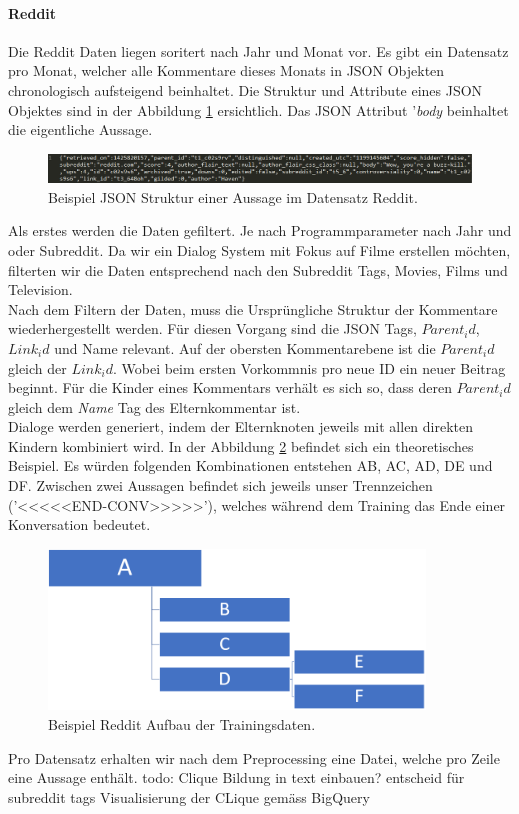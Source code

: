 \paragraph{Reddit} Die Reddit Daten liegen soritert nach Jahr und Monat vor. Es gibt ein Datensatz pro Monat, welcher alle Kommentare dieses Monats in JSON Objekten chronologisch aufsteigend beinhaltet. Die Struktur und Attribute eines JSON Objektes sind in der Abbildung \ref{fig:data:reddit:examp:json} ersichtlich. Das JSON Attribut '\emph{body} beinhaltet die eigentliche Aussage.
\begin{figure}[h]
	\centering
	\includegraphics[width=16cm]{img/Reddit_example_json.PNG}
	\caption{Beispiel JSON Struktur einer Aussage im Datensatz Reddit.}
	\label{fig:data:reddit:examp:json}
\end{figure}
Als erstes werden die Daten gefiltert. Je nach Programmparameter nach Jahr und oder Subreddit. Da wir ein Dialog System mit Fokus auf Filme erstellen möchten, filterten wir die Daten entsprechend nach den Subreddit Tags, Movies, Films und Television.\\
Nach dem Filtern der Daten, muss die Ursprüngliche Struktur der Kommentare wiederhergestellt werden. Für diesen Vorgang sind die JSON  Tags, \emph{$Parent_id$}, \emph{$Link_id$} und Name relevant. Auf der obersten Kommentarebene ist die \emph{$Parent_id$} gleich der \emph{$Link_id$}. Wobei beim ersten Vorkommnis pro neue ID ein neuer Beitrag beginnt. Für die Kinder eines Kommentars verhält es sich so, dass deren \emph{$Parent_id$} gleich dem \emph{Name} Tag des Elternkommentar ist.\\
Dialoge werden generiert, indem der Elternknoten jeweils mit allen direkten Kindern kombiniert wird. In der Abbildung \ref{fig:data:reddit:utterance:construction} befindet sich ein theoretisches Beispiel. Es würden folgenden Kombinationen entstehen AB, AC, AD, DE und DF. Zwischen zwei Aussagen befindet sich jeweils unser Trennzeichen ('<<<<<END-CONV>>>>>'), welches während dem Training das Ende einer Konversation bedeutet.
\begin{figure}[h]
	\centering
	\includegraphics[width=10cm]{img/reddit_utterance_construction.PNG}
	\caption{Beispiel Reddit Aufbau der Trainingsdaten.}
	\label{fig:data:reddit:utterance:construction}
\end{figure}
Pro Datensatz erhalten wir nach dem Preprocessing eine Datei, welche pro Zeile eine Aussage enthält.
todo: Clique Bildung in text einbauen? entscheid für subreddit tags Visualisierung der CLique gemäss BigQuery
